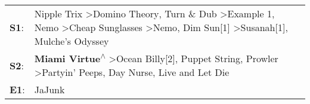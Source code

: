 \begin{supertabular}{p{0.03\textwidth}p{0.92\textwidth}}
 \textbf{S1}:  &  Nipple Trix\textsuperscript{} \textgreater \enspace Domino Theory\textsuperscript{}, \enspace Turn \& Dub\textsuperscript{} \textgreater \enspace Example 1\textsuperscript{}, \enspace Nemo\textsuperscript{} \textgreater \enspace Cheap Sunglasses\textsuperscript{} \textgreater \enspace Nemo\textsuperscript{}, \enspace Dim Sun[1]\textsuperscript{} \textgreater \enspace Susanah[1]\textsuperscript{}, \enspace Mulche's Odyssey\textsuperscript{}  \enspace  \\
 \textbf{S2}:  &                                                                                                                               \textbf{Miami Virtue\textsuperscript{$\wedge$}} \textgreater \enspace Ocean Billy[2]\textsuperscript{}, \enspace Puppet String\textsuperscript{}, \enspace Prowler\textsuperscript{} \textgreater \enspace Partyin' Peeps\textsuperscript{}, \enspace Day Nurse\textsuperscript{}, \enspace Live and Let Die\textsuperscript{}  \enspace  \\
 \textbf{E1}:  &                                                                                                                                                                                                                                                                                                                                                                                                                                     JaJunk\textsuperscript{}  \enspace  \\
\end{supertabular}
